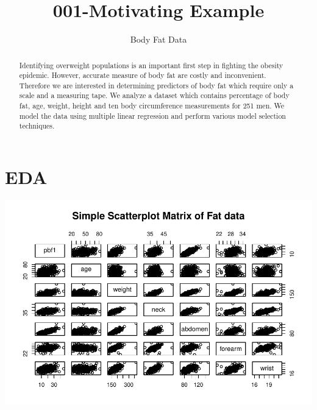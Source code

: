 \documentclass[11pt,letter]{article}\usepackage[]{graphicx}\usepackage[]{color}
\makeatletter
\def\maxwidth{ %
  \ifdim\Gin@nat@width>\linewidth
    \linewidth
  \else
    \Gin@nat@width
  \fi
}
\newenvironment{knitrout}{}{} %
\makeatother
\begin{document}
\pagestyle{fancy}

\title{001-Motivating Example}
\author{Body Fat Data}
\maketitle








\begin{abstract}
Identifying overweight populations is an important first step in fighting the obesity epidemic. However, accurate measure of body fat are costly and inconvenient. Therefore we are interested in determining predictors of body fat which require only a scale and a measuring tape. We analyze a dataset which contains percentage of body fat, age, weight, height and ten body circumference measurements for 251 men. We model the data using multiple linear regression and perform various model selection techniques.
\end{abstract}


\section{EDA}



\begin{knitrout}
\color{fgcolor}

{\centering \includegraphics[width=\maxwidth]{figure/fig-pairs-1} 

}



\end{knitrout}
\end{document}
